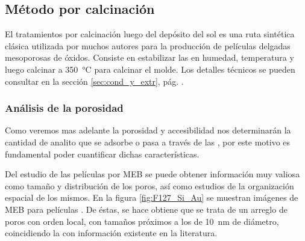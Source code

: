 	\subsection{Método por calcinación}
	 	
	 		El tratamientos por calcinación luego del depósito del sol es una ruta sintética clásica utilizada por muchos autores para la producción de películas delgadas mesoporosas de óxidos\cite{Soler-Illia2002a,Brinker1999,Soler-Illia2006,Grosso2004,Innocenzi2013,anglome2011}. Consiste en estabilizar las \pdm\space en humedad, temperatura y luego calcinar a \SI{350}{\celsius} para calcinar el molde. Los detalles técnicos se pueden consultar en la sección \ref{sec:cond_y_extr}, pág. \pageref{sec:cond_y_extr}.

	 	\subsubsection{Análisis de la porosidad}

		 Como veremos mas adelante la porosidad y accesibilidad nos determinarán la cantidad de analito que se adsorbe o pasa a través de las \pdm, por este motivo es fundamental poder cuantificar dichas características. 

		 Del estudio de las películas por MEB se puede obtener información muy valiosa como tamaño y distribución de los poros, así como estudios de la organización espacial de los mismos. En la figura \ref{fig:F127_Si_Au} se muestran imágenes de MEB para películas \pdmF. De éstas, se hace obtiene que se trata de un arreglo de poros con orden local, con tamaños próximos a los de \SI{10}{\nm} de diámetro, coincidiendo la con información existente en la literatura\cite{urade2005,angelome2011,lee2006}.  

